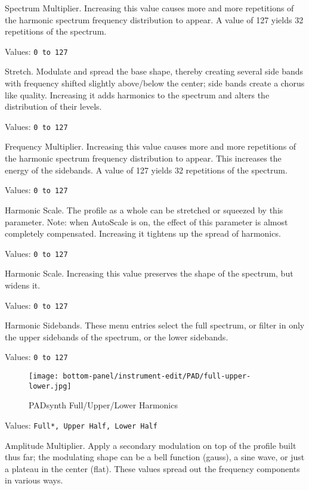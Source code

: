    Spectrum Multiplier.
   Increasing this value causes more and more repetitions of the harmonic
   spectrum frequency distribution to appear.  A value of 127 yields 32
   repetitions of the spectrum.

   Values: \texttt{0 to 127}

   Stretch.
   Modulate and spread the base shape, thereby creating several side bands with
   frequency shifted slightly above/below the center; side bands create a
   chorus like quality.
   Increasing it adds harmonics to the
   spectrum and alters the distribution of their levels.

   Values: \texttt{0 to 127}

   Frequency Multiplier.
   Increasing this value causes more and more repetitions of the harmonic
   spectrum frequency distribution to appear.
   This increases the energy of the sidebands.
   A value of 127 yields 32 repetitions of the spectrum.

   Values: \texttt{0 to 127}

   Harmonic Scale.
   The profile as a whole can be stretched or squeezed by this parameter.  Note:
   when AutoScale is on, the effect of this parameter is almost
   completely compensated.
   Increasing it tightens up the spread of harmonics.

   Values: \texttt{0 to 127}

   Harmonic Scale.
   Increasing this value preserves the shape of the spectrum, but widens it.

   Values: \texttt{0 to 127}

   Harmonic Sidebands.
   These menu entries select the full spectrum, or filter in only
   the upper sidebands of the spectrum, or the lower sidebands.

   Values: \texttt{0 to 127}

\begin{figure}[H]
   \centering
   \texttt{[image: bottom-panel/instrument-edit/PAD/full-upper-lower.jpg]}
   \caption{PADsynth Full/Upper/Lower Harmonics}
   \label{fig:padsynth_full_upper_lower}
\end{figure}

   Values: \texttt{Full*, Upper Half, Lower Half}

   Amplitude Multiplier.
   Apply a secondary modulation on top of the profile built thus far; the
   modulating shape can be a bell function (gauss), a sine wave, or just a plateau
   in the center (flat).   These values spread out the frequency components in
   various ways.

